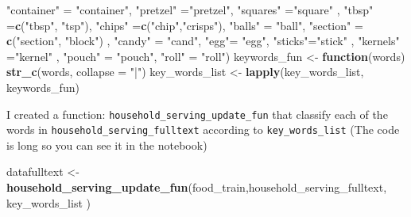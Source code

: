 \documentclass[
]{article}
\newenvironment{Shaded}{\begin{snugshade}}{\end{snugshade}}
\newcommand{\ControlFlowTok}[1]{\textcolor[rgb]{0.13,0.29,0.53}{\textbf{#1}}}
\newcommand{\DataTypeTok}[1]{\textcolor[rgb]{0.13,0.29,0.53}{#1}}
\newcommand{\KeywordTok}[1]{\textcolor[rgb]{0.13,0.29,0.53}{\textbf{#1}}}
\newcommand{\NormalTok}[1]{#1}
\newcommand{\OperatorTok}[1]{\textcolor[rgb]{0.81,0.36,0.00}{\textbf{#1}}}
\newcommand{\StringTok}[1]{\textcolor[rgb]{0.31,0.60,0.02}{#1}}
\begin{document}
\begin{Shaded}
\begin{Highlighting}[]
                   \StringTok{"container"}\NormalTok{ =}\StringTok{ "container"}\NormalTok{,  }\StringTok{"pretzel"}\NormalTok{ =}\StringTok{"pretzel"}\NormalTok{, }\StringTok{"squares"}\NormalTok{ =}\StringTok{"square"}\NormalTok{ ,}
                   \StringTok{"tbsp"}\NormalTok{ =}\KeywordTok{c}\NormalTok{(}\StringTok{"tbsp"}\NormalTok{, }\StringTok{"tsp"}\NormalTok{),  }\StringTok{"chips"}\NormalTok{ =}\KeywordTok{c}\NormalTok{(}\StringTok{"chip"}\NormalTok{,}\StringTok{"crisps"}\NormalTok{), }\StringTok{"balls"}\NormalTok{ =}\StringTok{ "ball"}\NormalTok{,}
                   \StringTok{"section"}\NormalTok{ =}\StringTok{ }\KeywordTok{c}\NormalTok{(}\StringTok{"section"}\NormalTok{, }\StringTok{"block"}\NormalTok{) , }\StringTok{"candy"}\NormalTok{ =}\StringTok{ "cand"}\NormalTok{,    }\StringTok{"egg"}\NormalTok{=}\StringTok{ "egg"}\NormalTok{,}
                   \StringTok{"sticks"}\NormalTok{=}\StringTok{"stick"}\NormalTok{ ,   }\StringTok{"kernels"}\NormalTok{ =}\StringTok{"kernel"}\NormalTok{ , }\StringTok{"pouch"}\NormalTok{ =}\StringTok{ "pouch"}\NormalTok{,   }\StringTok{"roll"}\NormalTok{ =}\StringTok{ "roll"}\NormalTok{)}
\NormalTok{keywords_fun <-}\StringTok{ }\ControlFlowTok{function}\NormalTok{(words) }\KeywordTok{str_c}\NormalTok{(words, }\DataTypeTok{collapse =} \StringTok{"|"}\NormalTok{)}
\NormalTok{key_words_list <-}\StringTok{ }\KeywordTok{lapply}\NormalTok{(key_words_list, keywords_fun)}
\end{Highlighting}
\end{Shaded}

I created a function: \texttt{household\_serving\_update\_fun} that
classify each of the words in \texttt{household\_serving\_fulltext}
according to \texttt{key\_words\_list} (The code is long so you can see
it in the notebook)

\begin{Shaded}
\begin{Highlighting}[]
\NormalTok{datafulltext <-}\StringTok{ }\KeywordTok{household_serving_update_fun}\NormalTok{(food_train,household_serving_fulltext, key_words_list )}
\end{Highlighting}
\end{Shaded}

\begin{Shaded}
\end{Shaded}
\end{document}

